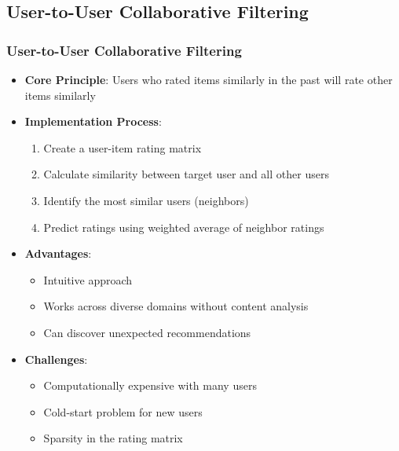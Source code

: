 \documentclass{beamer}
\begin{document}
\subsection{User-to-User Collaborative Filtering}
\begin{frame}
\frametitle{User-to-User Collaborative Filtering}
\begin{itemize}
    \item \textbf{Core Principle}: Users who rated items similarly in the past will rate other items similarly
    
    \item \textbf{Implementation Process}:
    \begin{enumerate}
        \item Create a user-item rating matrix
        \item Calculate similarity between target user and all other users
        \item Identify the most similar users (neighbors)
        \item Predict ratings using weighted average of neighbor ratings
    \end{enumerate}
    
    \item \textbf{Advantages}:
    \begin{itemize}
        \item Intuitive approach
        \item Works across diverse domains without content analysis
        \item Can discover unexpected recommendations
    \end{itemize}
    
    \item \textbf{Challenges}:
    \begin{itemize}
        \item Computationally expensive with many users
        \item Cold-start problem for new users
        \item Sparsity in the rating matrix
    \end{itemize}
\end{itemize}
\end{frame}
\end{document}
